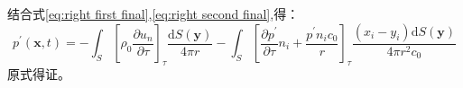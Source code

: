 结合式\eqref{eq:right first final},\eqref{eq:right second final},得：
\begin{equation}
    p^{\prime}(\mathbf{x}, t)=-\int_{S}\left[\rho_{0} \frac{\partial u_{n}}{\partial \tau}\right]_{\tau} \frac{\mathrm{d} S(\mathbf{y})}{4 \pi r}-\int_{S}\left[\frac{\partial p^{\prime}}{\partial \tau} n_{i}+\frac{p^{\prime} n_{i} c_{0}}{r}\right]_{\tau} \frac{\left(x_{i}-y_{i}\right) \mathrm{d} S(\mathbf{y})}{4 \pi r^{2} c_{0}}
\end{equation}
原式得证。

\clearpage




